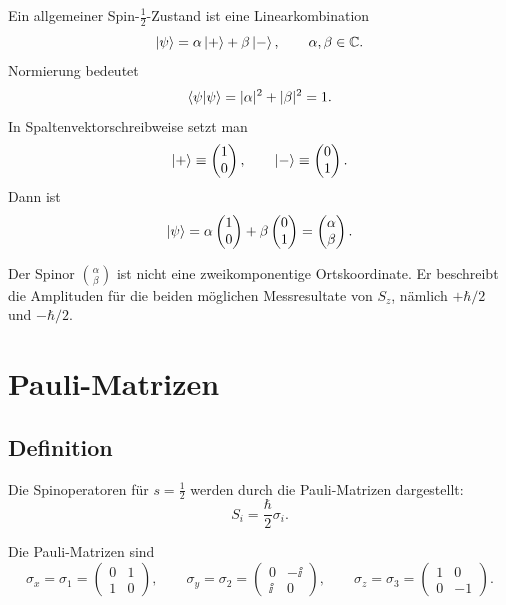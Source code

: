 Ein allgemeiner Spin-\(\frac12\)-Zustand ist eine Linearkombination
\[
    \left|\psi\right\rangle=\alpha\left|+\right\rangle+\beta\left|-\right\rangle,
    \qquad \alpha,\beta\in\mathbb C.
\]
Normierung bedeutet
\[
    \left\langle\psi\middle|\psi\right\rangle=|\alpha|^2+|\beta|^2=1.
\]
In Spaltenvektorschreibweise setzt man
\[
    \left|+\right\rangle\equiv
    \begin{pmatrix}
        1\\0
    \end{pmatrix},
    \qquad
    \left|-\right\rangle\equiv
    \begin{pmatrix}
        0\\1
    \end{pmatrix}.
\]
Dann ist
\[
    \left|\psi\right\rangle=\alpha
    \begin{pmatrix}
        1\\0
    \end{pmatrix}
    +\beta
    \begin{pmatrix}
        0\\1
    \end{pmatrix}
    =
    \begin{pmatrix}
        \alpha\\\beta
    \end{pmatrix}.
\]

\begin{notebox}
Der Spinor \(\binom{\alpha}{\beta}\) ist nicht eine zweikomponentige Ortskoordinate. Er beschreibt die Amplituden für die beiden möglichen Messresultate von \(S_z\), nämlich \(+\hbar/2\) und \(-\hbar/2\).
\end{notebox}

\section{Pauli-Matrizen}

\subsection{Definition}

Die Spinoperatoren für \(s=\frac12\) werden durch die Pauli-Matrizen dargestellt:
\[
    S_i=\frac{\hbar}{2}\sigma_i.
\]

\begin{definitionbox}
Die Pauli-Matrizen sind
\[
    \sigma_x=\sigma_1=
    \begin{pmatrix}
        0&1\\
        1&0
    \end{pmatrix},
    \qquad
    \sigma_y=\sigma_2=
    \begin{pmatrix}
        0&-\ii\\
        \ii&0
    \end{pmatrix},
    \qquad
    \sigma_z=\sigma_3=
    \begin{pmatrix}
        1&0\\
        0&-1
    \end{pmatrix}.
\]
\end{definitionbox}

